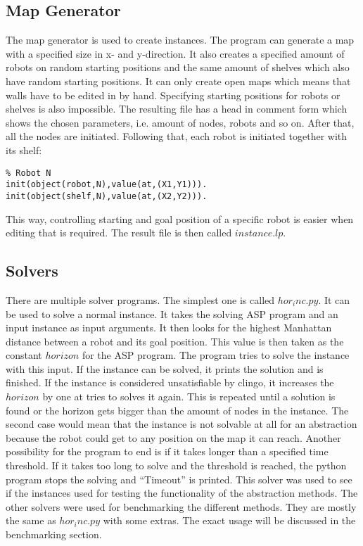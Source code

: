 \documentclass[runningheads]{llncs}
\begin{document}
\subsection{Map Generator}
The map generator is used to create instances. The program can generate a map with a specified size in x- and y-direction. It also creates a specified amount of robots on random starting positions and the same amount of shelves which also have random starting positions. It can only create open maps which means that walls have to be edited in by hand. Specifying starting positions for robots or shelves is also impossible. The resulting file has a head in comment form which shows the chosen parameters, i.e. amount of nodes, robots and so on. After that, all the nodes are initiated. Following that, each robot is initiated together with its shelf:
\begin{verbatim}
% Robot N
init(object(robot,N),value(at,(X1,Y1))).
init(object(shelf,N),value(at,(X2,Y2))).
\end{verbatim}
This way, controlling starting and goal position of a specific robot is easier when editing that is required. The result file is then called $instance.lp$.
\subsection{Solvers}
There are multiple solver programs. The simplest one is called $hor_inc.py$. It can be used to solve a normal instance. It takes the solving ASP program and an input instance as input arguments. It then looks for the highest Manhattan distance between a robot and its goal position. This value is then taken as the constant $horizon$ for the ASP program. The program tries to solve the instance with this input. If the instance can be solved, it prints the solution and is finished. If the instance is considered unsatisfiable by clingo, it increases the $horizon$ by one at tries to solves it again. This is repeated until a solution is found or the horizon gets bigger than the amount of nodes in the instance. The second case would mean that the instance is not solvable at all for an abstraction because the robot could get to any position on the map it can reach. Another possibility for the program to end is if it takes longer than a specified time threshold. If it takes too long to solve and the threshold is reached, the python program stops the solving and ``Timeout'' is printed. This solver was used to see if the instances used for testing the functionality of the abstraction methods. The other solvers were used for benchmarking the different methods. They are mostly the same as $hor_inc.py$ with some extras. The exact usage will be discussed in the benchmarking section.
\end{document}
